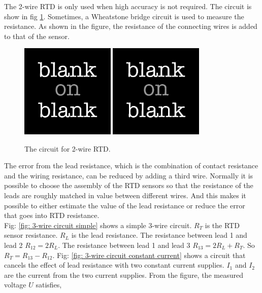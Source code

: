 The 2-wire RTD is only used when high accuracy is not required. The circuit is show in fig \ref{fig: 2-wire circuit}. Sometimes, a Wheatstone bridge circuit is used to measure the resistance. As shown in the figure, the resistance of the connecting wires is added to that of the sensor. 
\begin{figure}[h!]
  \centering
  \includegraphics[width=0.4\textwidth]
  {blank.jpg}
  \includegraphics[width=0.4\textwidth]
  {blank.jpg}
  \caption{The circuit for 2-wire RTD.}
  \label{fig: 2-wire circuit}
\end{figure}
The error from the lead resistance, which is the combination of contact resistance and the wiring resistance, can be reduced by adding a third wire. Normally it is possible to choose the assembly of the RTD sensors so that the resistance of the leads are roughly matched in value between different wires. And this makes it possible to either estimate the value of the lead resistance or reduce the error that goes into RTD resistance. 
\\
Fig: \ref{fig: 3-wire circuit simple} shows a simple 3-wire circuit. $R_T$ is the RTD sensor resistance. $R_{L}$ is the lead resistance. The resistance between lead 1 and lead 2 $R_{12} = 2 R_{L}$. The resistance between lead 1 and lead 3 $R_{13} = 2 R_{L}+ R_{T}$. So $R_T = R_{13} - R_{12}$. 
Fig: \ref{fig: 3-wire circuit constant current} shows a circuit that cancels the effect of lead resistance with two constant current supplies. $I_1$ and $I_2$ are the current from the two current supplies. From the figure, the measured voltage $U$ satisfies,  
